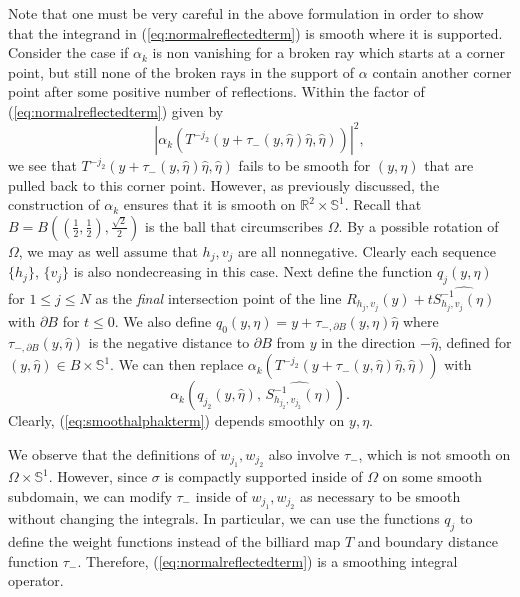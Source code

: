 \documentclass[10pt]{amsart}
\theoremstyle{definition}
\theoremstyle{definition}
\theoremstyle{definition}
\newcommand{ \rn }[1]{\mathbb{R}^{#1}}
\begin{document}
Note that one must be very careful in the above formulation in order to show that the integrand in (\ref{eq:normalreflectedterm}) is smooth where it is supported. Consider the case if $\alpha_{k}$ is non vanishing for a broken ray which starts at a corner point, but still none of the broken rays in the support of $\alpha$ contain another corner point after some positive number of reflections. Within the factor of (\ref{eq:normalreflectedterm}) given by
\begin{equation*}
|\alpha_{k}(T^{-j_{2}}(y + \tau_{-}(y,\widehat{\eta})\widehat{\eta}, \widehat{\eta}))|^{2},
\end{equation*}
we see that $T^{-j_{2}}(y + \tau_{-}(y,\widehat{\eta})\widehat{\eta}, \widehat{\eta})$ fails to be smooth for $(y, \eta)$ that are pulled back to this corner point. However, as previously discussed, the construction of $\alpha_{k}$ ensures that it is smooth on $\rn{2}\times \mathbb{S}^{1}$. Recall that $B = B\left( \left( \frac{1}{2}, \frac{1}{2} \right), \frac{\sqrt{2}}{2}\right)$ is the ball that circumscribes $\Omega$. By a possible rotation of $\Omega$, we may as well assume that $h_{j},v_{j}$ are all nonnegative. Clearly each sequence $\{h_{j}\}$, $\{v_{j}\}$ is also nondecreasing in this case. Next define the function $q_{j}(y, \eta)$ for $1 \leq j \leq N$ as the \textit{final} intersection point of the line $R_{h_{j},v_{j}}(y) + t \widehat{S_{h_{j},v_{j}}^{-1}(\eta)}$ with $\partial B$ for $t \leq 0$. We also define $q_{0}(y,\eta) = y + \tau_{-,\partial B}(y,\eta) \widehat{\eta}$ where $\tau_{-,\partial B}(y,\widehat{\eta})$ is the negative distance to $\partial B$ from $y$ in the direction $-\widehat{\eta}$, defined for $(y,\widehat{\eta}) \in B \times \mathbb{S}^{1}$. We can then replace $\alpha_{k}(T^{-j_{2}}(y + \tau_{-}(y,\widehat{\eta})\widehat{\eta}, \widehat{\eta}))$ with
\begin{equation}
\alpha_{k}(q_{j_{2}}(y,\widehat{\eta}), \, \widehat{S_{h_{j_{2}}, v_{j_{2}}}^{-1}(\eta)}). \label{eq:smoothalphakterm}
\end{equation}
Clearly, (\ref{eq:smoothalphakterm}) depends smoothly on $y, \eta$.

We observe that the definitions of $w_{j_{1}}, w_{j_{2}}$ also involve $\tau_{-}$, which is not smooth on $\Omega \times \mathbb{S}^{1}$. However, since $\sigma$ is compactly supported inside of $\Omega$ on some smooth subdomain, we can modify $\tau_{-}$ inside of $w_{j_{1}},w_{j_{2}}$ as necessary to be smooth without changing the integrals. In particular, we can use the functions $q_{j}$ to define the weight functions instead of the billiard map $T$ and boundary distance function $\tau_{-}$. Therefore, (\ref{eq:normalreflectedterm}) is a smoothing integral operator.
\end{document}
